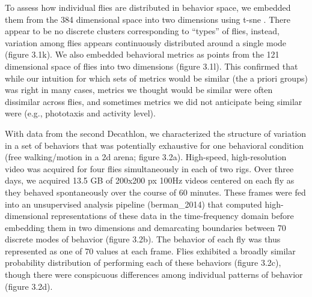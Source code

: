 \documentclass[12pt,letterpaper]{article}
\begin{document}
To assess how individual flies are distributed in behavior space, we embedded them from the 384 dimensional space into two dimensions using t-sne \cite{Maaten_Visualizing_2008}. There appear to be no discrete clusters corresponding to “types” of flies, instead, variation among flies appears continuously distributed around a single mode (figure 3.1k). We also embedded behavioral metrics as points from the 121 dimensional space of flies into two dimensions (figure 3.1l). This confirmed that while our intuition for which sets of metrics would be similar (the a priori groups) was right in many cases, metrics we thought would be similar were often dissimilar across flies, and sometimes metrics we did not anticipate being similar were (e.g., phototaxis and activity level). 

With data from the second Decathlon, we characterized the structure of variation in a set of behaviors that was potentially exhaustive for one behavioral condition (free walking/motion in a 2d arena; figure 3.2a). High-speed, high-resolution video was acquired for four flies simultaneously in each of two rigs. Over three days, we acquired 13.5 GB of 200x200 px 100Hz videos centered on each fly as they behaved spontaneously over the course of 60 minutes. These frames were fed into an unsupervised analysis pipeline (berman_2014) that computed high-dimensional representations of these data in the time-frequency domain before embedding them in two dimensions and demarcating boundaries between 70 discrete modes of behavior (figure 3.2b). The behavior of each fly was thus represented as one of 70 values at each frame. Flies exhibited a broadly similar probability distribution of performing each of these behaviors (figure 3.2c), though there were conspicuous differences among individual patterns of behavior (figure 3.2d). 
\end{document}
